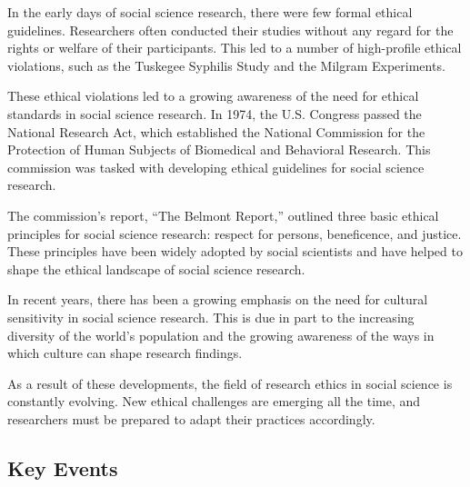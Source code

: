 \documentclass[
  b5paper]{book}
\begin{document}
In the early days of social science research, there were few formal ethical guidelines. Researchers often conducted their studies without any regard for the rights or welfare of their participants. This led to a number of high-profile ethical violations, such as the Tuskegee Syphilis Study and the Milgram Experiments.

These ethical violations led to a growing awareness of the need for ethical standards in social science research. In 1974, the U.S. Congress passed the National Research Act, which established the National Commission for the Protection of Human Subjects of Biomedical and Behavioral Research. This commission was tasked with developing ethical guidelines for social science research.

The commission's report, ``The Belmont Report,'' outlined three basic ethical principles for social science research: respect for persons, beneficence, and justice. These principles have been widely adopted by social scientists and have helped to shape the ethical landscape of social science research.

In recent years, there has been a growing emphasis on the need for cultural sensitivity in social science research. This is due in part to the increasing diversity of the world's population and the growing awareness of the ways in which culture can shape research findings.

As a result of these developments, the field of research ethics in social science is constantly evolving. New ethical challenges are emerging all the time, and researchers must be prepared to adapt their practices accordingly.

\hypertarget{key-events}{%
\subsection*{Key Events}\label{key-events}}
\end{document}
